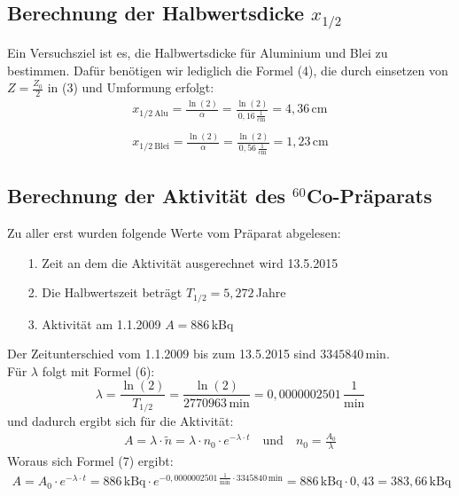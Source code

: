 \documentclass[fontsize=12pt]{scrartcl}
\begin{document}
\subsection{Berechnung der Halbwertsdicke $x_{1/2}$}

Ein Versuchsziel ist es, die Halbwertsdicke für Aluminium und Blei zu bestimmen. Dafür benötigen wir lediglich die Formel (4), die durch einsetzen von $Z=\frac{Z_0}{2}$ in (3) und Umformung erfolgt:
\begin{align*}
x_{1/2~\text{Alu}} = \frac{\ln(2)}{\alpha}= \frac{\ln(2)}{0,16\,\frac{1}{\text{cm}}}=4,36\,\text{cm}\\
~\\
x_{1/2~\text{Blei}} = \frac{\ln(2)}{\alpha}= \frac{\ln(2)}{0,56\,\frac{1}{\text{cm}}}=1,23\,\text{cm} 
\end{align*}

\newpage
\subsection{Berechnung der Aktivität des  $^{60}$Co-Präparats}

Zu aller erst wurden folgende Werte vom Präparat abgelesen:
\begin{itemize}
\item[1.]	Zeit an dem die Aktivität ausgerechnet wird  13.5.2015
\item[2.]	Die Halbwertszeit beträgt $T_{1/2}=5,272$\,Jahre
\item[3.]	Aktivität am 1.1.2009 $A=886$\,kBq
\end{itemize}
Der Zeitunterschied vom 1.1.2009 bis zum 13.5.2015 sind $3345840\,\text{min}$.\\
Für $\lambda$ folgt mit Formel (6):
\begin{equation*}
\lambda  = \frac{\ln(2)}{T_{1/2}} =  \frac{\ln(2)}{2770963\,\text{min}}= 0,0000002501\,\frac{1}{\text{min}}
\end{equation*}
und dadurch ergibt sich für die Aktivität:
\begin{align*}
A = {\lambda}\cdot \tilde{n} = {\lambda}\cdot n_0 \cdot e^{-\lambda\cdot t}\quad\text{und}\quad
n_0 =\frac{A_0}{\lambda}
\end{align*}
Woraus sich Formel (7) ergibt:
\begin{align*}
A= A_0 \cdot e^{-\lambda\cdot t}=886\,\text{kBq}\cdot  e^{- 0,0000002501\,\frac{1}{\text{min}} \cdot 3345840\,\text{min}}=886\,\text{kBq}\cdot 0,43 = 383,66\,\text{kBq}
\end{align*}
\noindent
\end{document}
